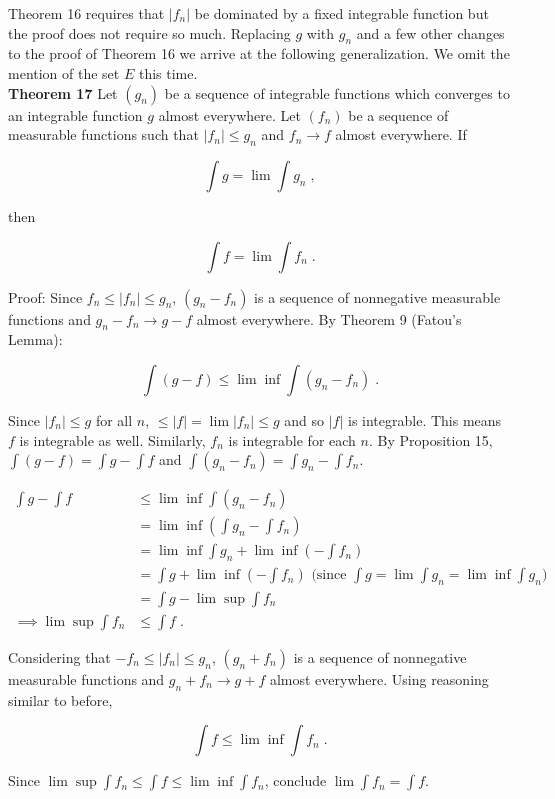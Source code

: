 \documentclass[a4paper]{article}
\begin{document}
Theorem 16 requires that $|f_n|$ be dominated by a fixed integrable function but the proof does not require so much. Replacing $g$ with $g_n$ and a few other changes to the proof of Theorem 16 we arrive at the following generalization. We omit the mention of the set $E$ this time. \\

{\bf Theorem 17} Let $(g_n)$ be a sequence of integrable functions which converges to an integrable function $g$ almost everywhere. Let $(f_n)$ be a sequence of measurable functions such that $|f_n| \leq g_n$ and $f_n \rightarrow f$ almost everywhere. If 

$$\int g = \lim \int g_n \;, $$

then

$$\int f = \lim \int f_n \;.$$

Proof: Since $f_n \leq |f_n| \leq g_n$, $(g_n-f_n)$ is a sequence of nonnegative measurable functions and $g_n-f_n \rightarrow g-f$ almost everywhere. By Theorem 9 (Fatou's Lemma):

$$\int (g-f) \leq \lim \inf \int (g_n- f_n) \;.$$

Since $|f_n| \leq g$ for all $n$, $\leq |f| = \lim |f_n| \leq g$ and so $|f|$ is integrable. This means $f$ is integrable as well. Similarly, $f_n$ is integrable for each $n$. By Proposition 15, $\int (g-f) = \int g - \int f$ and $\int (g_n - f_n) = \int g_n - \int f_n$. 

\begin{align*}
\int g - \int f &\leq \lim \inf \int (g_n-f_n)\\
& =\lim \inf \left(\int g_n - \int f_n \right)\\
&= \lim \inf \int g_n + \lim \inf \left(-\int f_n\right) \\
&= \int g+ \lim \inf \left(-\int f_n\right) \text{ (since }\int g = \lim \int g_n = \lim \inf \int g_n\text{)}\\
&= \int g - \lim \sup \int f_n\\
\implies \lim \sup \int f_n &\leq \int f \;.
\end{align*}

Considering that $-f_n \leq |f_n| \leq g_n$, $(g_n+f_n)$ is a sequence of nonnegative measurable functions and $g_n+f_n \rightarrow g + f$ almost everywhere. Using reasoning similar to before, 

$$\int f \leq \lim \inf \int f_n \;.$$

Since $\lim \sup \int f_n \leq \int f \leq \lim \inf \int f_n$, conclude $\lim \int f_n = \int f$. \\
\end{document}
